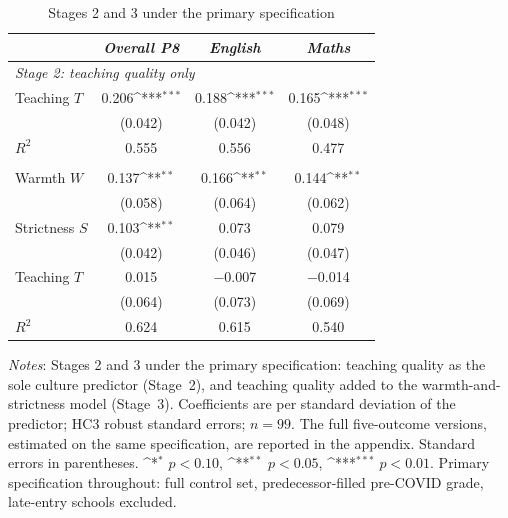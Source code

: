 \begin{table}[htbp]\centering
\caption{Stages 2 and 3 under the primary specification}
\label{tab:stages23_trio}
\def\sym#1{\ifmmode^{#1}\else\(^{#1}\)\fi}
\small
\begin{tabular}{lccc}
\toprule
 & \textit{Overall P8} & \textit{English} & \textit{Maths} \\
\midrule
\multicolumn{4}{l}{\textit{Stage 2: teaching quality only}} \\
\addlinespace[2pt]
Teaching $T$ & 0.206\sym{***} & 0.188\sym{***} & 0.165\sym{***} \\
             & (0.042) & (0.042) & (0.048) \\
$R^2$        & 0.555 & 0.556 & 0.477 \\
\addlinespace[6pt]
\multicolumn{4}{l}{\textit{Stage 3: warmth, strictness and teaching}} \\
\addlinespace[2pt]
Warmth $W$   & 0.137\sym{**} & 0.166\sym{**} & 0.144\sym{**} \\
             & (0.058) & (0.064) & (0.062) \\
Strictness $S$ & 0.103\sym{**} & 0.073 & 0.079 \\
             & (0.042) & (0.046) & (0.047) \\
Teaching $T$ & 0.015 & $-$0.007 & $-$0.014 \\
             & (0.064) & (0.073) & (0.069) \\
$R^2$        & 0.624 & 0.615 & 0.540 \\
\bottomrule
\end{tabular}
\begin{minipage}{0.8\linewidth}
\vspace{4pt}\scriptsize
\textit{Notes}: Stages 2 and 3 under the primary specification: teaching quality as the sole culture predictor (Stage~2), and teaching quality added to the warmth-and-strictness model (Stage~3). Coefficients are per standard deviation of the predictor; HC3 robust standard errors; $n = 99$. The full five-outcome versions, estimated on the same specification, are reported in the appendix. Standard errors in parentheses. \sym{*} \(p<0.10\),
\sym{**} \(p<0.05\), \sym{***} \(p<0.01\). Primary specification throughout: full
control set, predecessor-filled pre-COVID grade, late-entry schools
excluded.
\end{minipage}
\end{table}
